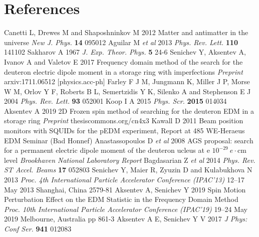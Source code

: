 \documentclass[a4paper]{jpconf}
\begin{document}
\section*{References}
\begin{thebibliography}{4}
	Canetti L, Drewes M and Shaposhninkov M 2012 Matter and antimatter in the universe \textit{New J. Phys.} \textbf{14} 095012
	Aguilar M \textit{et al} 2013 \textit{Phys. Rev. Lett.} \textbf{110} 141102
	Sakharov A 1967 \textit{J. Exp. Theor. Phys.} \textbf{5} 24-6
	Senichev Y, Aksentev A, Ivanov A and Valetov E  2017 Frequency domain method of the search for
	the deuteron electric dipole moment in a storage ring with imperfections \textit{Preprint} arxiv:1711.06512 [physics.acc-ph]
	Farley F J M, Jungmann K, Miller J P, Morse W M, Orlov Y F, Roberts B L, Semertzidis Y K, Silenko A and Stephenson E J 2004 \textit{Phys. Rev. Lett.} \textbf{93} 052001
	Koop I A 2015 \textit{Phys. Scr.} \textbf{2015} 014034
	Aksentev A 2019 2D Frozen spin method of searching for the deuteron EDM in a storage ring \textit{Preprint} thesiscommons.org/cn4x3
	Kawall D 2011 Beam position monitors with SQUIDs for the
	pEDM experiment, Report at 485 WE-Heraeus EDM
	Seminar (Bad Honnef)
	Anastassopoulos D \textit{et al} 2008 AGS proposal: search for a permanent electric dipole moment of the deuteron ucleus at e $10^{-29}~e\cdot$cm level \textit{Brookhaven National Laboratory Report}
	Bagdasarian Z \textit{et al} 2014 \textit{Phys. Rev. ST Accel. Beams} \textbf{17} 052803
	Senichev Y, Maier R, Zyuzin D and Kulabukhova N 2013 \textit{Proc. 4th International Particle Accelerator Conference (IPAC'13)} 12--17 May 2013 Shanghai, China 2579-81
	Aksentev A, Senichev Y 2019 Spin Motion Perturbation Effect on the EDM Statistic
	in the Frequency Domain Method \textit{Proc. 10th International Particle Accelerator Conference (IPAC'19)} 19--24 May 2019 Melbourne, Australia pp 861-3
	Aksentev A E, Senichev Y V 2017 \textit{J Phys: Conf Ser.} \textbf{941} 012083
	
\end{thebibliography}
\end{document}
